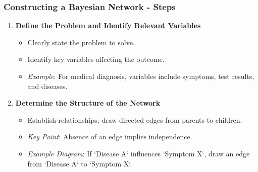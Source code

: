 \documentclass[aspectratio=169]{beamer}
\begin{document}
\begin{frame}[fragile]
    \frametitle{Constructing a Bayesian Network - Steps}
    \begin{enumerate}
        \item \textbf{Define the Problem and Identify Relevant Variables}
            \begin{itemize}
                \item Clearly state the problem to solve.
                \item Identify key variables affecting the outcome.
                \item \textit{Example}: For medical diagnosis, variables include symptoms, test results, and diseases.
            \end{itemize}

        \item \textbf{Determine the Structure of the Network}
            \begin{itemize}
                \item Establish relationships; draw directed edges from parents to children.
                \item \textit{Key Point}: Absence of an edge implies independence.
                \item \textit{Example Diagram}: If `Disease A` influences `Symptom X`, draw an edge from `Disease A` to `Symptom X`.
            \end{itemize}
    \end{enumerate}
\end{frame}
\end{document}
